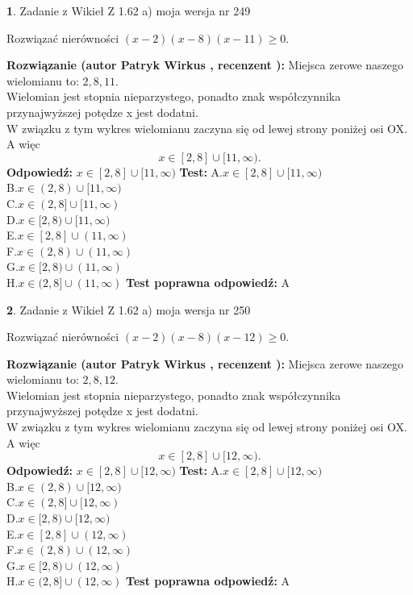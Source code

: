 \documentclass[12pt, a4paper]{article}
\theoremstyle{definition} %
\newtheorem{zad}{}
\newcommand{\zadStart}[1]{\begin{zad}#1\newline}
\newcommand{\zadStop}{\end{zad}}
\newcommand{\rozwStart}[2]{\noindent \textbf{Rozwiązanie (autor #1 , recenzent #2): }\newline}
\newcommand{\rozwStop}{\newline}
\newcommand{\odpStart}{\noindent \textbf{Odpowiedź:}\newline}
\newcommand{\odpStop}{\newline}
\newcommand{\testStart}{\noindent \textbf{Test:}\newline}
\newcommand{\testStop}{\newline}
\newcommand{\kluczStart}{\noindent \textbf{Test poprawna odpowiedź:}\newline}
\newcommand{\kluczStop}{\newline}
\begin{document}
\zadStart{Zadanie z Wikieł Z 1.62 a) moja wersja nr 249}

Rozwiązać nierówności $(x-2)(x-8)(x-11)\ge0$.
\zadStop
\rozwStart{Patryk Wirkus}{}
Miejsca zerowe naszego wielomianu to: $2, 8, 11$.\\
Wielomian jest stopnia nieparzystego, ponadto znak współczynnika przy\linebreak najwyższej potędze x jest dodatni.\\ W związku z tym wykres wielomianu zaczyna się od lewej strony poniżej osi OX. A więc $$x \in [2,8] \cup [11,\infty).$$
\rozwStop
\odpStart
$x \in [2,8] \cup [11,\infty)$
\odpStop
\testStart
A.$x \in [2,8] \cup [11,\infty)$\\
B.$x \in (2,8) \cup [11,\infty)$\\
C.$x \in (2,8] \cup [11,\infty)$\\
D.$x \in [2,8) \cup [11,\infty)$\\
E.$x \in [2,8] \cup (11,\infty)$\\
F.$x \in (2,8) \cup (11,\infty)$\\
G.$x \in [2,8) \cup (11,\infty)$\\
H.$x \in (2,8] \cup (11,\infty)$
\testStop
\kluczStart
A
\kluczStop



\zadStart{Zadanie z Wikieł Z 1.62 a) moja wersja nr 250}

Rozwiązać nierówności $(x-2)(x-8)(x-12)\ge0$.
\zadStop
\rozwStart{Patryk Wirkus}{}
Miejsca zerowe naszego wielomianu to: $2, 8, 12$.\\
Wielomian jest stopnia nieparzystego, ponadto znak współczynnika przy\linebreak najwyższej potędze x jest dodatni.\\ W związku z tym wykres wielomianu zaczyna się od lewej strony poniżej osi OX. A więc $$x \in [2,8] \cup [12,\infty).$$
\rozwStop
\odpStart
$x \in [2,8] \cup [12,\infty)$
\odpStop
\testStart
A.$x \in [2,8] \cup [12,\infty)$\\
B.$x \in (2,8) \cup [12,\infty)$\\
C.$x \in (2,8] \cup [12,\infty)$\\
D.$x \in [2,8) \cup [12,\infty)$\\
E.$x \in [2,8] \cup (12,\infty)$\\
F.$x \in (2,8) \cup (12,\infty)$\\
G.$x \in [2,8) \cup (12,\infty)$\\
H.$x \in (2,8] \cup (12,\infty)$
\testStop
\kluczStart
A
\kluczStop
\end{document}
